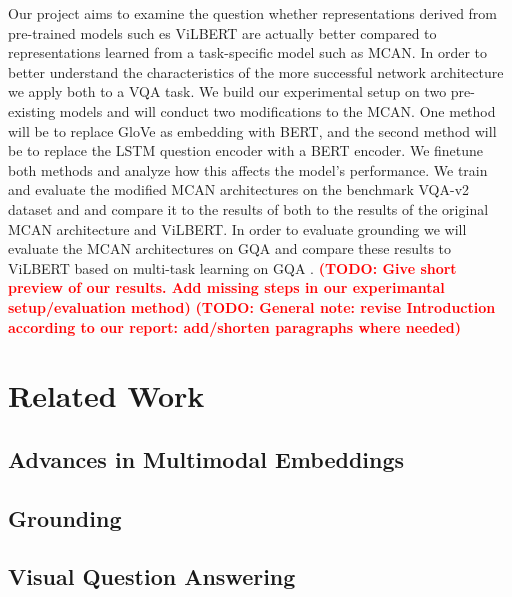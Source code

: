 \documentclass{article}
\newcommand{\todo}[1]{\textbf{\textcolor{Red}{(TODO: #1)}}}
\begin{document}
Our project aims to examine the question whether representations derived from pre-trained models such es ViLBERT are actually better compared to representations learned from a task-specific model such as MCAN. In order to better understand the characteristics of the more successful network architecture we apply both to a VQA task. We build our experimental setup on two pre-existing models and will conduct two modifications to the MCAN. One method will be to replace GloVe as embedding with BERT, and the second method will be to replace the LSTM question encoder with a BERT encoder. We finetune both methods and analyze how this affects the model’s performance. We train and evaluate the modified MCAN architectures on the benchmark VQA-v2 dataset \citep{goyal2017vqa2} and and compare it to the results of both to the results of the original MCAN architecture and ViLBERT. In order to evaluate grounding we will evaluate the MCAN architectures on GQA and compare these results to ViLBERT based on multi-task learning on GQA \citep{lu2020multitask}. \todo{Give short preview of our results. Add missing steps in our experimantal setup/evaluation method}
\todo{General note: revise Introduction according to our report: add/shorten paragraphs where needed}

\section{Related Work}
\subsection{Advances in Multimodal Embeddings} \label{embeds}

\subsection{Grounding}

\subsection{Visual Question Answering}
\end{document}
